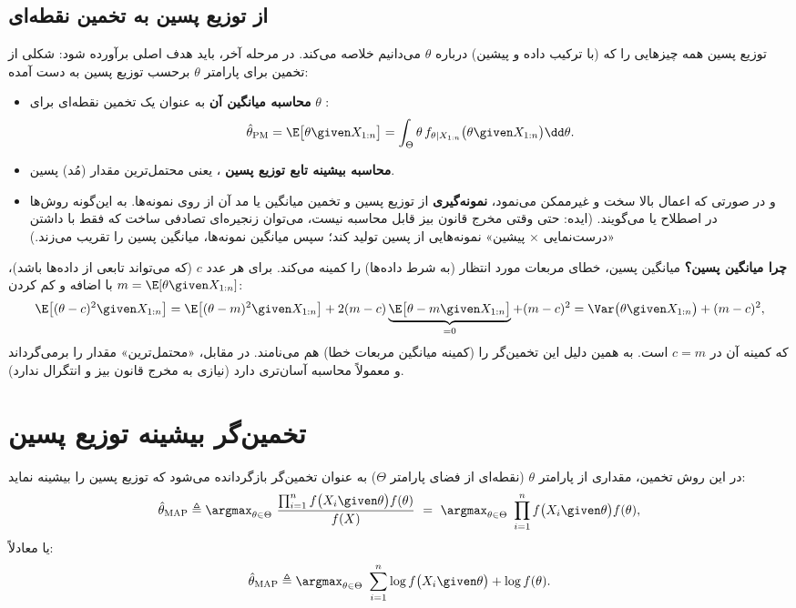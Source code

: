 \subsection{از توزیع پسین به تخمین نقطه‌ای}
توزیع پسین همه چیزهایی را که (با ترکیب داده و پیشین) درباره $\theta$ می‌دانیم خلاصه می‌کند. در مرحله آخر، باید هدف اصلی برآورده شود: شکلی از تخمین برای پارامتر $\theta$ برحسب توزیع پسین به دست آمده:
\begin{itemize}
\item \textbf{محاسبه میانگین آن} به عنوان یک تخمین نقطه‌ای برای $\theta$ :
\[
\hat\theta_{\mathrm{PM}}=\E\big[\theta\given X_{1:n}\big]=\int_\Theta\theta\,f_{\theta|X_{1:n}}\big(\theta\given X_{1:n}\big)\dd\theta .
\]
\item \textbf{محاسبه بیشینه تابع توزیع پسین} ، یعنی محتمل‌ترین مقدار (مُد) پسین.
\item و در صورتی که اعمال بالا سخت و غیرممکن می‌نمود، \textbf{نمونه‌گیری } از توزیع پسین و تخمین میانگین یا مد آن از روی نمونه‌ها. به این‌گونه روش‌ها در اصطلاح  یا  می‌گویند. (ایده: حتی وقتی مخرج قانون بیز قابل محاسبه نیست، می‌توان زنجیره‌ای تصادفی ساخت که فقط با داشتن «درست‌نمایی × پیشین» نمونه‌هایی از پسین تولید کند؛ سپس میانگین نمونه‌ها، میانگین پسین را تقریب می‌زند.)
\end{itemize}

\begin{note}
\notetitle \textbf{چرا میانگین پسین؟} میانگین پسین، خطای مربعات مورد انتظار (به شرط داده‌ها) را کمینه می‌کند. برای هر عدد $c$ (که می‌تواند تابعی از داده‌ها باشد)، با اضافه و کم کردن $m=\E[\theta\given X_{1:n}]$:
\[
\E\big[(\theta-c)^2\given X_{1:n}\big]=\E\big[(\theta-m)^2\given X_{1:n}\big]+2(m-c)\underbrace{\E\big[\theta-m\given X_{1:n}\big]}_{=0}+(m-c)^2=\Var\big(\theta\given X_{1:n}\big)+(m-c)^2,
\]
که کمینه آن در $c=m$ است. به همین دلیل این تخمین‌گر را  (کمینه میانگین مربعات خطا) هم می‌نامند. در مقابل،  «محتمل‌ترین» مقدار را برمی‌گرداند و معمولاً محاسبه آسان‌تری دارد (نیازی به مخرج قانون بیز و انتگرال ندارد).
\end{note}

\section{تخمین‌گر بیشینه توزیع پسین }

\begin{definition}
در این روش تخمین، مقداری از پارامتر $\theta$ (نقطه‌ای از فضای پارامتر $\Theta$) به عنوان تخمین‌گر بازگردانده می‌شود که توزیع پسین  را بیشینه نماید:
\[
\hat\theta_{\mathrm{MAP}}\triangleq\argmax_{\theta\in\Theta}\ \frac{\prod_{i=1}^nf\big(X_i\given\theta\big)f(\theta)}{f(X)}\ =\ \argmax_{\theta\in\Theta}\ \prod_{i=1}^nf\big(X_i\given\theta\big)f(\theta),
\]
یا معادلاً:
\[
\hat\theta_{\mathrm{MAP}}\triangleq\argmax_{\theta\in\Theta}\ \sum_{i=1}^n\log f\big(X_i\given\theta\big)+\log f(\theta).
\]
\end{definition}

